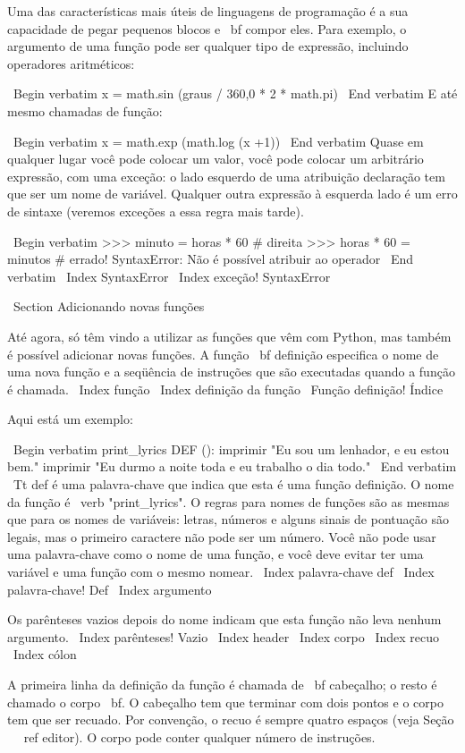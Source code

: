 \documentclass[10pt]{book}
\begin{document}
{Uma das características mais úteis de linguagens de programação é a sua
capacidade de pegar pequenos blocos e {\ bf compor} eles. Para
exemplo, o argumento de uma função pode ser qualquer tipo de expressão,
incluindo operadores aritméticos:

\ Begin {verbatim}
x = math.sin (graus / 360,0 * 2 * math.pi)
\ End {verbatim}
%
E até mesmo chamadas de função:

\ Begin {verbatim}
x = math.exp (math.log (x +1))
\ End {verbatim}
%
Quase em qualquer lugar você pode colocar um valor, você pode colocar um arbitrário
expressão, com uma exceção: o lado esquerdo de uma atribuição
declaração tem que ser um nome de variável. Qualquer outra expressão à esquerda
lado é um erro de sintaxe (veremos exceções a essa regra
mais tarde).

\ Begin {verbatim}
>>> minuto = horas * 60 # direita
>>> horas * 60 = minutos # errado!
SyntaxError: Não é possível atribuir ao operador
\ End {verbatim}
%
\ Index {} SyntaxError
\ Index {exceção! SyntaxError}


\ Section {Adicionando novas funções}

Até agora, só têm vindo a utilizar as funções que vêm com Python,
mas também é possível adicionar novas funções.
A função {\ bf definição} especifica o nome de uma nova função e
a seqüência de instruções que são executadas quando a função é chamada.
\ Index {função}
\ Index {definição da função}
\ {Função definição!} Índice

Aqui está um exemplo:

\ Begin {verbatim}
print_lyrics DEF ():
    imprimir "Eu sou um lenhador, e eu estou bem."
    imprimir "Eu durmo a noite toda e eu trabalho o dia todo."
\ End {verbatim}
%
{\ Tt def} é uma palavra-chave que indica que esta é uma função
definição. O nome da função é \ verb "print_lyrics". O
regras para nomes de funções são as mesmas que para os nomes de variáveis: letras,
números e alguns sinais de pontuação são legais, mas o primeiro caractere
não pode ser um número. Você não pode usar uma palavra-chave como o nome de uma função,
e você deve evitar ter uma variável e uma função com o mesmo
nomear.
\ Index {palavra-chave def}
\ Index {palavra-chave! Def}
\ Index {argumento}

Os parênteses vazios depois do nome indicam que esta função
não leva nenhum argumento.
\ Index {parênteses! Vazio}
\ Index {header}
\ Index {corpo}
\ Index {recuo}
\ Index {} cólon

A primeira linha da definição da função é chamada de {\ bf cabeçalho};
o resto é chamado o corpo {\ bf}. O cabeçalho tem que terminar com dois pontos
e o corpo tem que ser recuado. Por convenção, o recuo é
sempre quatro espaços (veja Seção ~ \ ref {editor}). O corpo pode conter
qualquer número de instruções.

}
\end{document}
